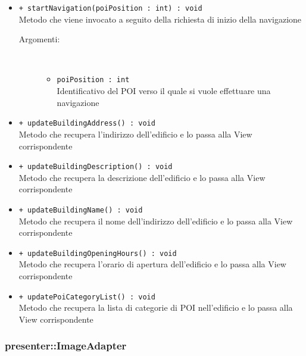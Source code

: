 \documentclass[../DefinizioneDiProdotto.tex]{subfiles}
\begin{document}
\begin{description}
\begin{itemize}
 \item \texttt{+ startNavigation(poiPosition : int) : void}\\
Metodo che viene invocato a seguito della richiesta di inizio della navigazione
 \begin{description}
\item[Argomenti:] \
\begin{itemize}
\item \texttt{poiPosition : int}\\
Identificativo del POI verso il quale si vuole effettuare una navigazione\end{itemize}
\end{description}
\item \texttt{+ updateBuildingAddress() : void}\\
Metodo che recupera l'indirizzo dell'edificio e lo passa alla View corrispondente
 \item \texttt{+ updateBuildingDescription() : void}\\
Metodo che recupera la descrizione dell'edificio e lo passa alla View corrispondente
 \item \texttt{+ updateBuildingName() : void}\\
Metodo che recupera il nome dell'indirizzo dell'edificio e lo passa alla View corrispondente
 \item \texttt{+ updateBuildingOpeningHours() : void}\\
Metodo che recupera l'orario di apertura dell'edificio e lo passa alla View corrispondente
 \item \texttt{+ updatePoiCategoryList() : void}\\
Metodo che recupera la lista di categorie di POI nell'edificio e lo passa alla View corrispondente
 \end{itemize}
\end{description}

\subsubsection{presenter::ImageAdapter}
\end{document}
